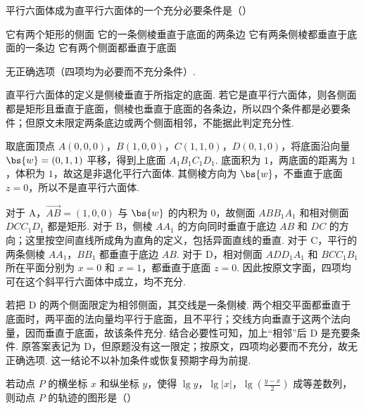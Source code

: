 \documentclass[UTF8,a4paper,oneside,11pt]{ctexbook}
\begin{document}
\begin{problem}

平行六面体成为直平行六面体的一个充分必要条件是（\quad）

\choices
{它有两个矩形的侧面}
{它的一条侧棱垂直于底面的两条边}
{它有两条侧棱都垂直于底面的一条边}
{它有两个侧面都垂直于底面}
\end{problem}

\begin{answer}
无正确选项（四项均为必要而不充分条件）.
\end{answer}

\begin{solution}
直平行六面体的定义是侧棱垂直于所指定的底面. 若它是直平行六面体，则各侧面都是矩形且垂直于底面，侧棱也垂直于底面的各条边，所以四个条件都是必要条件；但原文未限定两条底边或两个侧面相邻，不能据此判定充分性.

取底面顶点 \(A\left(0,0,0\right)\)，\(B\left(1,0,0\right)\)，\(C\left(1,1,0\right)\)，\(D\left(0,1,0\right)\)，将底面沿向量 \(\bs{w}=\left(0,1,1\right)\) 平移，得到上底面 \(A_1B_1C_1D_1\). 底面积为 \(1\)，两底面的距离为 \(1\)，体积为 \(1\)，故这是非退化平行六面体. 其侧棱方向为 \(\bs{w}\)，不垂直于底面 \(z=0\)，所以不是直平行六面体.

对于 A，\(\overrightarrow{AB}=\left(1,0,0\right)\) 与 \(\bs{w}\) 的内积为 \(0\)，故侧面 \(ABB_1A_1\) 和相对侧面 \(DCC_1D_1\) 都是矩形. 对于 B，侧棱 \(AA_1\) 的方向同时垂直于底边 \(AB\) 和 \(DC\) 的方向；这里按空间直线所成角为直角的定义，包括异面直线的垂直. 对于 C，平行的两条侧棱 \(AA_1\)，\(BB_1\) 都垂直于底边 \(AB\). 对于 D，相对侧面 \(ADD_1A_1\) 和 \(BCC_1B_1\) 所在平面分别为 \(x=0\) 和 \(x=1\)，都垂直于底面 \(z=0\). 因此按原文字面，四项均可在这个斜平行六面体中成立，均不充分.

若把 D 的两个侧面限定为相邻侧面，其交线是一条侧棱. 两个相交平面都垂直于底面时，两平面的法向量均平行于底面，且不平行；交线方向垂直于这两个法向量，因而垂直于底面，故该条件充分. 结合必要性可知，加上“相邻”后 D 是充要条件. 原答案表记为 D，但原题没有这一限定；按原文，四项均必要而不充分，故无正确选项. 这一结论不以补加条件或恢复预期字母为前提.
\end{solution}

\begin{problem}

若动点 \(P\) 的横坐标 \(x\) 和纵坐标 \(y\)，使得 \(\lg y\)，\(\lg|x|\)，\(\lg\left(\frac{y-x}{2}\right)\) 成等差数列，则动点 \(P\) 的轨迹的图形是（\quad）

\choices
{}
{}
{}
{}
\end{problem}
\end{document}
